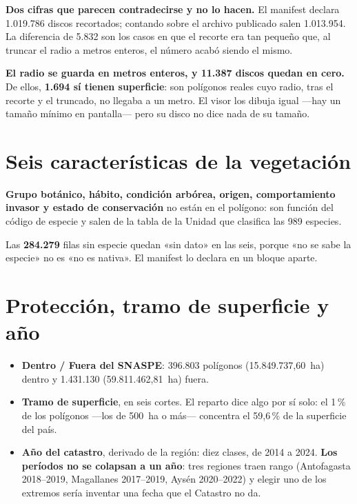 \documentclass[11pt,a4paper]{report}
\newcommand{\campo}[1]{\textcolor{conaf}{\textbf{#1}}}
\begin{document}
\begin{nota}
\campo{Dos cifras que parecen contradecirse y no lo hacen.} El manifest declara
1.019.786 discos recortados; contando sobre el archivo publicado salen
1.013.954. La diferencia de 5.832 son los casos en que el recorte era tan
pequeño que, al truncar el radio a metros enteros, el número acabó siendo el
mismo.
\end{nota}

\begin{alerta}
\campo{El radio se guarda en metros enteros, y 11.387 discos quedan en cero.}
De ellos, \textbf{1.694 sí tienen superficie}: son polígonos reales cuyo radio,
tras el recorte y el truncado, no llegaba a un metro. El visor los dibuja igual
—hay un tamaño mínimo en pantalla— pero su disco no dice nada de su tamaño.
\end{alerta}

\section{Seis características de la vegetación}

\campo{Grupo botánico, hábito, condición arbórea, origen, comportamiento invasor
y estado de conservación} no están en el polígono: son función del código de
especie y salen de la tabla de la Unidad que clasifica las 989 especies.

\begin{alerta}
Las \textbf{284.279} filas sin especie quedan «sin dato» en las seis, porque «no
se sabe la especie» no es «no es nativa». El manifest lo declara en un bloque
aparte.
\end{alerta}

\section{Protección, tramo de superficie y año}

\begin{itemize}
  \item \campo{Dentro / Fuera del SNASPE}: 396.803 polígonos (15.849.737,60~ha)
        dentro y 1.431.130 (59.811.462,81~ha) fuera.
  \item \campo{Tramo de superficie}, en seis cortes. El reparto dice algo por sí
        solo: el 1\,\% de los polígonos —los de 500~ha o más— concentra el
        59,6\,\% de la superficie del país.
  \item \campo{Año del catastro}, derivado de la región: diez clases, de 2014 a
        2024. \campo{Los períodos no se colapsan a un año}: tres regiones traen
        rango (Antofagasta 2018--2019, Magallanes 2017--2019, Aysén 2020--2022) y
        elegir uno de los extremos sería inventar una fecha que el Catastro no da.
\end{itemize}
\end{document}
